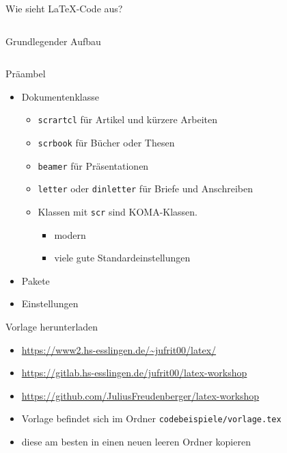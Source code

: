 \documentclass[presentation,aspectratio=169]{beamer}
\begin{document}
\begin{frame}{Wie sieht \LaTeX-Code aus?}
  \inputminted{latex}{codebeispiele/beispiel.tex}
\end{frame}

\begin{frame}{Grundlegender Aufbau}
  \inputminted{latex}{codebeispiele/aufbau.tex}
\end{frame}

\begin{frame}[fragile]{Präambel}
  \begin{itemize}
    \item Dokumentenklasse
      \begin{itemize}
        \item \verb|scrartcl| für Artikel und kürzere Arbeiten
        \item \verb|scrbook| für Bücher oder Thesen
        \item \verb|beamer| für Präsentationen
        \item \verb|letter| oder \verb|dinletter| für Briefe und Anschreiben
        \item Klassen mit \verb|scr| sind KOMA-Klassen.
          \begin{itemize}
            \item modern
            \item viele gute Standardeinstellungen
          \end{itemize}
      \end{itemize}
    \item Pakete
    \item Einstellungen
  \end{itemize}
\end{frame}

\begin{frame}[fragile]{Vorlage herunterladen}
  \begin{itemize}
    \item \href{https://www2.hs-esslingen.de/~jufrit00/latex/}{https://www2.hs-esslingen.de/\textasciitilde{}jufrit00/latex/}
    \item \href{https://gitlab.hs-esslingen.de/jufrit00/latex-workshop}{https://gitlab.hs-esslingen.de/jufrit00/latex-workshop}
    \item \href{https://github.com/JuliusFreudenberger/latex-workshop}{https://github.com/JuliusFreudenberger/latex-workshop}
      \bigskip
    \item Vorlage befindet sich im Ordner \verb|codebeispiele/vorlage.tex|
    \item diese am besten in einen neuen leeren Ordner kopieren
  \end{itemize}
\end{frame}
\end{document}
